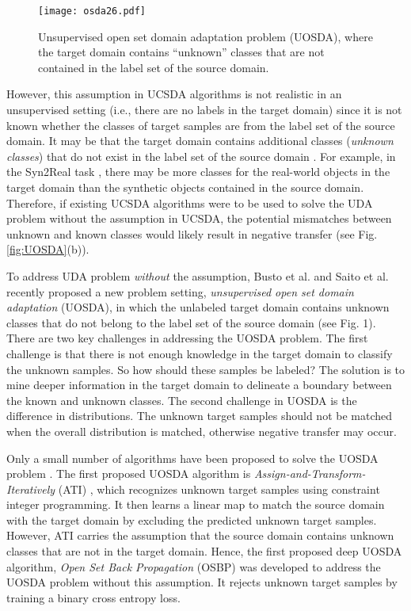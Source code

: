 \documentclass[journal]{IEEEtran}
\begin{document}
\begin{figure}[!]
\centering
\texttt{[image: osda26.pdf]}
\caption{Unsupervised open set domain adaptation problem (UOSDA), where the target domain contains ``unknown'' classes that are not contained in the label set of the source domain.
}
\end{figure}
However, this assumption in UCSDA algorithms is not realistic in an unsupervised setting (i.e., there are no labels in the target domain) since it is not known whether the classes
of target samples are from the label set of the source domain. It may be that the target domain contains additional classes (\textit{unknown classes}) that do not exist in the label set of the source domain \cite{DBLP:conf/eccv/SaitoYUH18}. For example, in the Syn2Real task \cite{DBLP:journals/corr/abs-1806-09755}, there may be more classes for the real-world objects in the target domain than the synthetic objects contained in the source domain. Therefore, if existing UCSDA algorithms were to be used to solve the UDA problem without the assumption in UCSDA, the potential mismatches between unknown and known classes would likely result in negative transfer \cite{rosenstein2005transfer} (see Fig. \ref{fig:UOSDA}(b)).


To address UDA problem \textit{without} the assumption, Busto et al. \cite{DBLP:conf/iccv/BustoG17} and Saito et al. \cite{DBLP:conf/eccv/SaitoYUH18}
recently proposed a new problem setting, \textit{unsupervised open set domain adaptation} (UOSDA), in which the unlabeled target domain contains unknown classes that do not belong to the label set of the source domain (see Fig. 1). There are two key challenges \cite{DBLP:conf/eccv/SaitoYUH18} in addressing the UOSDA problem. 
The first challenge is that there is not enough knowledge in the target domain to classify the unknown samples. So how should these samples be labeled? The solution is to mine deeper information in the target domain to delineate a boundary
between the known and unknown classes. The second challenge in UOSDA is the difference in distributions. The unknown target samples should not be matched when the overall distribution is matched, otherwise negative transfer may occur. 

Only a small number of algorithms have been proposed to solve the UOSDA problem \cite{DBLP:conf/iccv/BustoG17,DBLP:conf/eccv/SaitoYUH18,baktashmotlagh2018learning,longmingsheng,DBLP:conf/icmcs/ZhangLHCZG19}. The first proposed UOSDA algorithm is \textit{Assign-and-Transform-Iteratively} (ATI) \cite{DBLP:conf/iccv/BustoG17}, which recognizes unknown target samples using constraint integer programming. It then learns a linear map to match the source domain with the target domain by excluding the predicted unknown target samples. However, ATI carries the assumption that the source domain contains unknown classes that are not in the target domain. Hence, the first proposed deep UOSDA algorithm,  \textit{Open  Set  Back Propagation}  (OSBP) \cite{DBLP:conf/eccv/SaitoYUH18}  was developed to address the UOSDA problem without this assumption. It rejects unknown target samples by training a binary cross entropy loss.  
\end{document}
